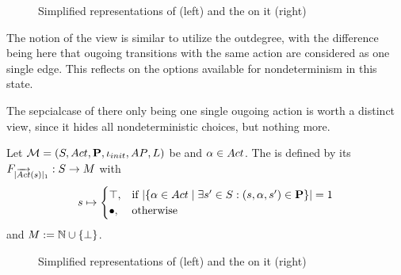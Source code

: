\documentclass[preview]{standalone}
\begin{document}
\begin{figure}[h]
	\begin{minipage}{.5\textwidth}
		\hspace{5mm}
		
	\end{minipage}%
	\begin{minipage}{.5\textwidth}						
		\centering
		
	\end{minipage}	
	\caption{Simplified representations of \mdp (left) and the \viewN \viewoutactsetsize on it (right)}	
	\label{fig:outActSetSize}  	
\end{figure}

The notion of the view is similar to utilize the outdegree, with the difference being here that ougoing transitions with the same action are considered as one single edge. This reflects on the options available for nondeterminism in this state.

The sepcialcase of there only being one single ougoing action is worth a distinct view, since it hides all nondeterministic choices, but nothing more.

\begin{definition}
	Let ${{{\mathcal{M}}}} = {{({S}, {Act}, {\textbf{P}}, {\iota_{init}}, {AP}, {L})}}$ be \achgphN and ${\alpha} \in {Act}$. The \viewN \viewoutactsingle is defined by its \grpfctN ${{F_{{|{\overrightarrow{{Act}}}({s})|_1}}}} : {S} \to {\ensuremath{{M}}}$ with
	\[{s} \mapsto 
	\begin{cases}
		{\top}, &\text{if } |\{{\alpha} \in {Act} \mid \exists {s}' \in {S} : ({s}, {\alpha}, {s}') \in {\ensuremath{{\textbf{P}}}}\}| = 1 \\ 
		{\bullet}, &\text{otherwise}
	\end{cases}
	\]
	and ${{M}} := {\mathbb{N}} \cup {\{\bot\}}$.
\end{definition}

\begin{figure}[h]
	\begin{minipage}{.5\textwidth}
		\hspace{5mm}
		
	\end{minipage}%
	\begin{minipage}{.5\textwidth}						
		\centering
		
	\end{minipage}	
	\caption{Simplified representations of \mdp (left) and the \viewN \viewoutactsetsize on it (right)}	
	\label{fig:outActSingle}  	
\end{figure}
\end{document}
